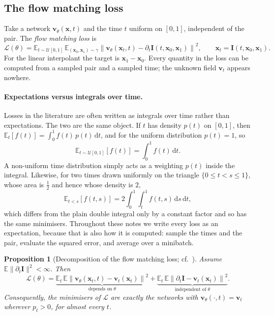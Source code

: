 \documentclass[11pt,a4paper]{article}
\numberwithin{equation}{section}     %
\theoremstyle{plain}        %
\newtheorem{proposition}[theorem]{Proposition}
\theoremstyle{definition}   %
\theoremstyle{remark}       %
\begin{document}
\subsection{The flow matching loss}

Take a network $\mathbf{v}_\theta(\mathbf{x},t)$ and the time $t$ uniform on $[0,1]$, independent of the pair. The \emph{flow matching loss} \citep{lipman2023,liu2023,albergo2023building} is
\[
\mathcal{L}(\theta)=\mathbb{E}_{t\sim\mathcal{U}[0,1]}\,\mathbb{E}_{(\mathbf{x}_0,\mathbf{x}_1)\sim\gamma}\left\|\mathbf{v}_\theta(\mathbf{x}_t,t)-\partial_t\mathbf{I}(t,\mathbf{x}_0,\mathbf{x}_1)\right\|^2,\qquad\mathbf{x}_t=\mathbf{I}(t,\mathbf{x}_0,\mathbf{x}_1).
\]
For the linear interpolant the target is $\mathbf{x}_1-\mathbf{x}_0$. Every quantity in the loss can be computed from a sampled pair and a sampled time; the unknown field $\mathbf{v}_t$ appears nowhere.

\paragraph{Expectations versus integrals over time.} Losses in the literature are often written as integrals over time rather than expectations. The two are the same object. If $t$ has density $p(t)$ on $[0,1]$, then $\mathbb{E}_t[f(t)]=\int_0^1 f(t)\,p(t)\,\mathrm{d}t$, and for the uniform distribution $p(t)=1$, so
\[
\mathbb{E}_{t\sim\mathcal{U}[0,1]}\left[f(t)\right]=\int_0^1 f(t)\,\mathrm{d}t .
\]
A non-uniform time distribution simply acts as a weighting $p(t)$ inside the integral. Likewise, for two times drawn uniformly on the triangle $\{0\le t<s\le1\}$, whose area is $\tfrac12$ and hence whose density is $2$,
\[
\mathbb{E}_{t<s}\left[f(t,s)\right]=2\int_0^1\!\!\int_t^1 f(t,s)\,\mathrm{d}s\,\mathrm{d}t ,
\]
which differs from the plain double integral only by a constant factor and so has the same minimisers. Throughout these notes we write every loss as an expectation, because that is also how it is computed: sample the times and the pair, evaluate the squared error, and average over a minibatch.


\begin{proposition}[Decomposition of the flow matching loss; cf.\ \citealp{lipman2023}]\label{prop:fmsplit}
Assume $\mathbb{E}\|\partial_t\mathbf{I}\|^2<\infty$. Then
\[
\mathcal{L}(\theta)=\underbrace{\mathbb{E}_{t}\,\mathbb{E}\left\|\mathbf{v}_\theta(\mathbf{x}_t,t)-\mathbf{v}_t(\mathbf{x}_t)\right\|^2}_{\text{depends on }\theta}+\underbrace{\mathbb{E}_{t}\,\mathbb{E}\left\|\partial_t\mathbf{I}-\mathbf{v}_t(\mathbf{x}_t)\right\|^2}_{\text{independent of }\theta} .
\]
Consequently, the minimisers of $\mathcal{L}$ are exactly the networks with $\mathbf{v}_\theta(\cdot,t)=\mathbf{v}_t$ wherever $p_t>0$, for almost every $t$.
\end{proposition}
\end{document}
